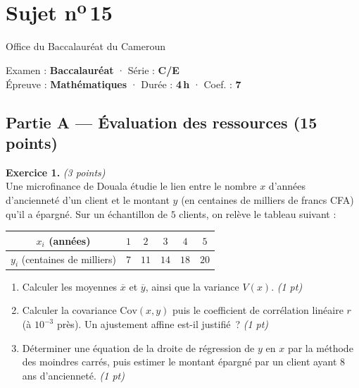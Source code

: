 \section{Sujet n\textsuperscript{o}\,15}
\noindent\begin{minipage}{0.5\linewidth}\footnotesize Office du Baccalauréat du Cameroun\end{minipage}%
\hfill\begin{minipage}{0.45\linewidth}\footnotesize\raggedleft Examen : \textbf{Baccalauréat} · Série : \textbf{C/E}\\
Épreuve : \textbf{Mathématiques} · Durée : \textbf{4\,h} · Coef. : \textbf{7}\end{minipage}
\par\smallskip{\color{onbo}\rule{\linewidth}{1pt}}

\subsection*{Partie A — Évaluation des ressources \hfill (15 points)}

\noindent\textbf{Exercice 1.} \hfill\textit{(3 points)}\\
Une microfinance de Douala étudie le lien entre le nombre $x$ d'années d'ancienneté d'un
client et le montant $y$ (en centaines de milliers de francs CFA) qu'il a épargné. Sur un
échantillon de $5$ clients, on relève le tableau suivant :
\begin{center}\renewcommand{\arraystretch}{1.2}
\begin{tabular}{|c|c|c|c|c|c|}\hline
$x_i$ (années) & $1$ & $2$ & $3$ & $4$ & $5$ \\\hline
$y_i$ (centaines de milliers) & $7$ & $11$ & $14$ & $18$ & $20$ \\\hline
\end{tabular}\end{center}
\begin{enumerate}[label=\arabic*)]
\item Calculer les moyennes $\overline{x}$ et $\overline{y}$, ainsi que la variance
$V(x)$. \hfill\textit{(1 pt)}
\item Calculer la covariance $\mathrm{Cov}(x,y)$ puis le coefficient de corrélation
linéaire $r$ (à $10^{-3}$ près). Un ajustement affine est-il justifié~? \hfill\textit{(1 pt)}
\item Déterminer une équation de la droite de régression de $y$ en $x$ par la méthode des
moindres carrés, puis estimer le montant épargné par un client ayant $8$ ans
d'ancienneté. \hfill\textit{(1 pt)}
\end{enumerate}


